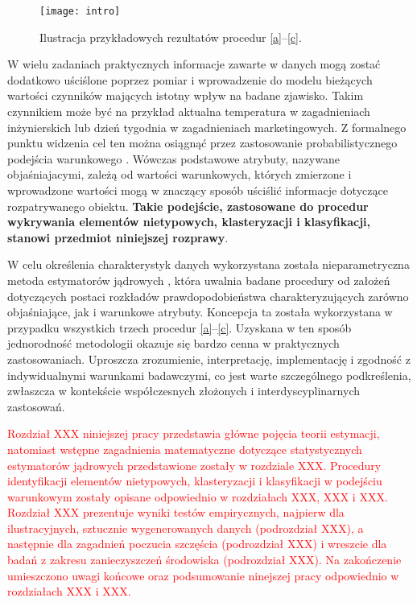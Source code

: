 \begin{figure}
    \centering
    \texttt{[image: intro]}
    \vspace{-0.5cm} 
    \caption{Ilustracja przykładowych rezultatów procedur \ref{a}--\ref{c}.}
    \label{fig:intro}
\end{figure}

W wielu zadaniach praktycznych informacje zawarte w danych mogą zostać dodatkowo uściślone poprzez pomiar i wprowadzenie do modelu bieżących wartości czynników mających istotny wpływ na badane zjawisko. Takim czynnikiem może być na przykład aktualna temperatura w zagadnieniach inżynierskich lub dzień tygodnia w zagadnieniach marketingowych. Z formalnego punktu widzenia cel ten można osiągnąć przez zastosowanie probabilistycznego podejścia warunkowego \cite{Casella_2002}. Wówczas podstawowe atrybuty, nazywane objaśniajacymi, zależą od wartości warunkowych, których zmierzone i wprowadzone wartości mogą w znaczący sposób uściślić informacje dotyczące rozpatrywanego obiektu. \textbf{Takie podejście, zastosowane do procedur wykrywania elementów nietypowych, klasteryzacji i klasyfikacji, stanowi przedmiot niniejszej rozprawy}.

W celu określenia charakterystyk danych wykorzystana została nieparametryczna metoda estymatorów jądrowych \cite{Kulczycki_2005, Wand_1995}, która uwalnia badane procedury od założeń dotyczących postaci rozkładów prawdopodobieństwa charakteryzujących zarówno objaśniające, jak i warunkowe atrybuty. Koncepcja ta została wykorzystana w przypadku wszystkich trzech procedur \ref{a}--\ref{c}. Uzyskana w ten sposób jednorodność metodologii okazuje się bardzo cenna w praktycznych zastosowaniach. Uproszcza zrozumienie, interpretację, implementację i zgodność z indywidualnymi warunkami badawczymi, co jest warte szczególnego podkreślenia, zwłaszcza w kontekście współczesnych złożonych i interdyscyplinarnych zastosowań.

\textcolor{red}{Rozdział XXX niniejszej pracy przedstawia główne pojęcia teorii estymacji, natomiast wstępne zagadnienia matematyczne dotyczące statystycznych estymatorów jądrowych przedstawione zostały w rozdziale XXX. Procedury identyfikacji elementów nietypowych, klasteryzacji i klasyfikacji w podejściu warunkowym zostały opisane odpowiednio w rozdziałach XXX, XXX i XXX. Rozdział XXX prezentuje wyniki testów empirycznych, najpierw dla ilustracyjnych, sztucznie wygenerowanych danych (podrozdział XXX), a następnie dla zagadnień poczucia szczęścia (podrozdział XXX) i wreszcie dla badań z zakresu zanieczyszczeń środowiska (podrozdział XXX). Na zakończenie umieszczono uwagi końcowe oraz podsumowanie ninejszej pracy odpowiednio w rozdziałach XXX i XXX.}
